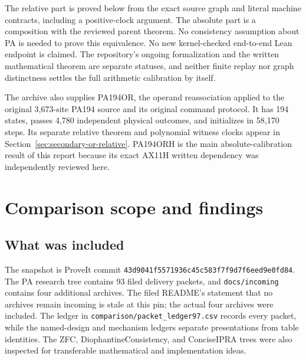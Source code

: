 \documentclass[11pt,a4paper]{article}
\theoremstyle{definition}
\newcommand{\file}[1]{\nolinkurl{#1}}
\begin{document}
The relative part is proved below from the exact source graph and literal
machine contracts, including a positive-clock argument. The absolute
part is a composition with the reviewed parent theorem. No consistency
assumption about PA is needed to prove this equivalence. No new
kernel-checked end-to-end Lean endpoint is claimed. The repository's
ongoing formalization and the written mathematical theorem are separate
statuses, and neither finite replay nor graph distinctness settles the
full arithmetic calibration by itself.

The archive also supplies PA194OR, the operand reassociation applied to
the original 3,673-site PA194 source and its original command protocol.
It has 194 states, passes 4,780 independent physical outcomes, and
initializes in 58,170 steps. Its separate relative theorem and polynomial
witness clocks appear in Section~\ref{sec:secondary-or-relative}.
PA194ORH is the main absolute-calibration result of this report because
its exact AX11H written dependency was independently reviewed here.

\section{Comparison scope and findings}
\label{sec:comparison}

\subsection{What was included}
The snapshot is ProveIt commit
\nolinkurl{43d9041f5571936c45c583f7f9d7f6eed9e0fd84}.
The PA research tree contains 93 filed delivery packets, and
\file{docs/incoming} contains four additional archives. The filed README's
statement that no archives remain incoming is stale at this pin; the
actual four archives were included. The ledger in
\file{comparison/packet_ledger97.csv} records every packet, while the
named-design and mechanism ledgers separate presentations from table
identities. The ZFC, DiophantineConsistency, and ConciseIPRA trees were
also inspected for transferable mathematical and implementation ideas.
\end{document}
